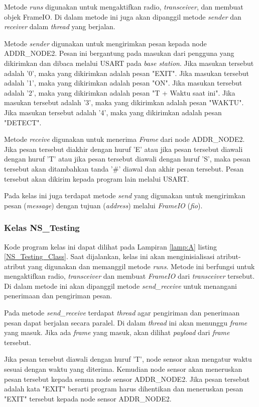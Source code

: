 Metode \textit{runs} digunakan untuk mengaktifkan radio, \textit{transceiver}, dan membuat objek FrameIO. Di dalam metode ini juga akan dipanggil metode \textit{sender} dan \textit{receiver} dalam \textit{thread} yang berjalan.

Metode \textit{sender} digunakan untuk mengirimkan pesan kepada node ADDR\_NODE2. Pesan ini bergantung pada masukan dari pengguna yang dikirimkan dan dibaca melalui USART pada \textit{base station}. Jika masukan tersebut adalah '0', maka yang dikirimkan adalah pesan "EXIT". Jika masukan tersebut adalah '1', maka yang dikirimkan adalah pesan "ON". Jika masukan tersebut adalah '2', maka yang dikirimkan adalah pesan "T + Waktu saat ini". Jika masukan tersebut adalah '3', maka yang dikirimkan adalah pesan "WAKTU". Jika masukan tersebut adalah '4', maka yang dikirimkan adalah pesan "DETECT". 

Metode \textit{receive} digunakan untuk menerima \textit{Frame} dari node ADDR\_NODE2. Jika pesan tersebut diakhir dengan huruf 'E' atau jika pesan tersebut diawali dengan huruf 'T' atau jika pesan tersebut diawali dengan huruf 'S', maka pesan tersebut akan ditambahkan tanda '\#' diawal dan akhir pesan tersebut. Pesan tersebut akan dikirim kepada program lain melalui USART.

Pada kelas ini juga terdapat metode \textit{send} yang digunakan untuk mengirimkan pesan (\textit{message}) dengan tujuan (\textit{address}) melalui \textit{FrameIO} (\textit{fio}).

\subsubsection{Kelas NS\_Testing}
Kode program kelas ini dapat dilihat pada Lampiran \ref{lamp:A} listing \ref{NS_Testing_Class}. Saat dijalankan, kelas ini akan menginisialisasi atribut-atribut yang digunakan dan memanggil metode \textit{runs}. Metode ini berfungsi untuk mengaktifkan radio, \textit{transceiver} dan membuat \textit{FrameIO} dari \textit{transceiver} tersebut. Di dalam metode ini akan dipanggil metode \textit{send\_receive} untuk menangani penerimaan dan pengiriman pesan.

Pada metode \textit{send\_receive} terdapat \textit{thread} agar pengiriman dan penerimaan pesan dapat berjalan secara paralel. Di dalam \textit{thread} ini akan menunggu \textit{frame} yang masuk. Jika ada \textit{frame} yang masuk, akan dilihat \textit{payload} dari \textit{frame} tersebut.

Jika pesan tersebut diawali dengan huruf 'T', node sensor akan mengatur waktu sesuai dengan waktu yang diterima. Kemudian node sensor akan meneruskan pesan tersebut kepada semua node sensor ADDR\_NODE2. Jika pesan tersebut adalah kata "EXIT" berarti program harus dihentikan dan meneruskan pesan "EXIT" tersebut kepada node sensor ADDR\_NODE2. 

